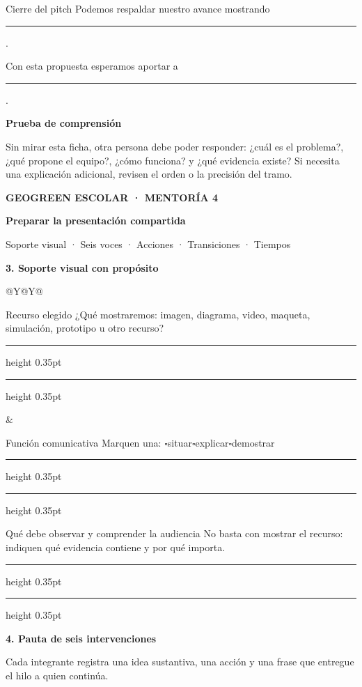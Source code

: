 \documentclass[10pt,a4paper]{article}
\newcommand{\writearea}[1]{\vspace{#1}\hrule height 0.35pt\vspace{4mm}\hrule height 0.35pt}
\newcommand{\checkline}[1]{$\square$\hspace{1.5mm}#1}
\newcommand{\pagehead}[2]{%
  {\small\bfseries\textcolor{AIEPRed}{GEOGREEN ESCOLAR · MENTORÍA 4}}\par
  \vspace{2mm}
  {\LARGE\bfseries\color{AIEPNavy}#1\par}
  {\normalsize\color{AIEPMuted}#2\par}
  \vspace{4mm}
}
\begin{document}
\begin{accentfield}[height=35mm]{Cierre del pitch}
Podemos respaldar nuestro avance mostrando \rule{80mm}{0.35pt}.\par
Con esta propuesta esperamos aportar a \rule{83mm}{0.35pt}.
\end{accentfield}

\begin{tcolorbox}[colback=AIEPNavy,colframe=AIEPNavy,coltext=white,boxrule=0pt,arc=1mm,left=3mm,right=3mm,top=2.5mm,bottom=2.5mm]
\textbf{Prueba de comprensión}\par
Sin mirar esta ficha, otra persona debe poder responder: ¿cuál es el problema?, ¿qué propone el equipo?, ¿cómo funciona? y ¿qué evidencia existe? Si necesita una explicación adicional, revisen el orden o la precisión del tramo.
\end{tcolorbox}

\newpage
\pagehead{Preparar la presentación compartida}{Soporte visual · Seis voces · Acciones · Transiciones · Tiempos}

{\large\bfseries\color{AIEPNavy}3. Soporte visual con propósito}\par
\begin{tabularx}{\textwidth}{@{}Y@{\hspace{4mm}}Y@{}}
\begin{fieldbox}[height=37mm]{Recurso elegido}
¿Qué mostraremos: imagen, diagrama, video, maqueta, simulación, prototipo u otro recurso?
\writearea{6mm}
\end{fieldbox}
&
\begin{fieldbox}[height=37mm]{Función comunicativa}
Marquen una: \checkline{situar}\quad\checkline{explicar}\quad\checkline{demostrar}
\writearea{6mm}
\end{fieldbox}
\end{tabularx}

\begin{fieldbox}[height=32mm]{Qué debe observar y comprender la audiencia}
No basta con mostrar el recurso: indiquen qué evidencia contiene y por qué importa.
\writearea{5mm}
\end{fieldbox}

{\large\bfseries\color{AIEPNavy}4. Pauta de seis intervenciones}\par
{\small Cada integrante registra una idea sustantiva, una acción y una frase que entregue el hilo a quien continúa.}
\end{document}
